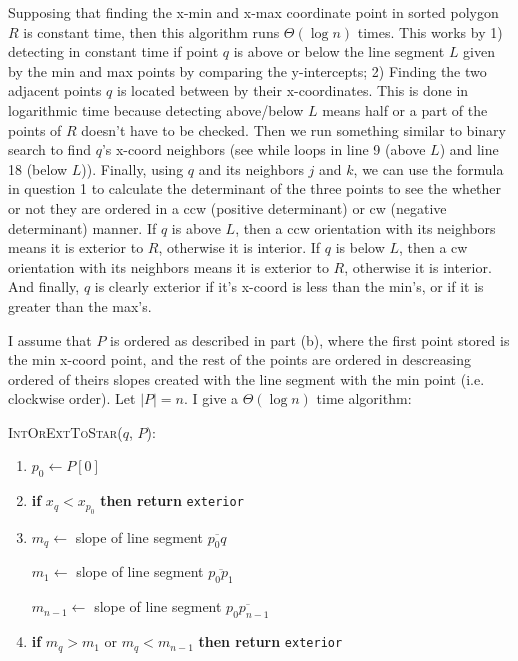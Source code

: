 \documentclass [12pt]{article}
\begin{document}
\begin{enumerate}[label=(\alph*)]
            Supposing that finding the x-min and x-max coordinate point in sorted polygon $R$ is constant time, then this algorithm runs $\Theta(\log n)$ times. This works by 1) detecting in constant time if point $q$ is above or below the line segment $L$ given by the min and max points by comparing the y-intercepts; 2) Finding the two adjacent points $q$ is located between by their x-coordinates. This is done in logarithmic time because detecting above/below $L$ means half or a part of the points of $R$ doesn't have to be checked. Then we run something similar to binary search to find $q$'s x-coord neighbors (see while loops in line 9 (above $L$) and line 18 (below $L$)). Finally, using $q$ and its neighbors $j$ and $k$, we can use the formula in question 1 to calculate the determinant of the three points to see the whether or not they are ordered in a ccw (positive determinant) or cw (negative determinant) manner. If $q$ is above $L$, then a ccw orientation with its neighbors means it is exterior to $R$, otherwise it is interior. If $q$ is below $L$, then a cw orientation with its neighbors means it is exterior to $R$, otherwise it is interior. And finally, $q$ is clearly exterior if it's x-coord is less than the min's, or if it is greater than the max's. 


            \pagebreak

            I assume that $P$ is ordered as described in part (b), where the first point stored is the min x-coord point, and the rest of the points are ordered in descreasing ordered of theirs slopes created with the line segment with the min point (i.e. clockwise order). Let $|P| = n$. I give a $\Theta(\log n)$ time algorithm:

        \cbstart
            \textsc{IntOrExtToStar($q$, $P$)}:
            \begin{enumerate}[label=\arabic*.]
                \item $p_0 \leftarrow P[0]$
                \item \textbf{if} $x_q < x_{p_0}$ \textbf{then return} \texttt{exterior}
                \item $m_q \leftarrow$ slope of line segment $\overline{p_0 q}$

                $m_1 \leftarrow$ slope of line segment $\overline{p_0 p_1}$

                $m_{n-1} \leftarrow$ slope of line segment $\overline{p_0 p_{n - 1}}$
                
                \item \textbf{if} $m_q > m_1$ or $m_q < m_{n-1}$ \textbf{then return} \texttt{exterior}
                

\end{enumerate}
\end{enumerate}
\end{document}
